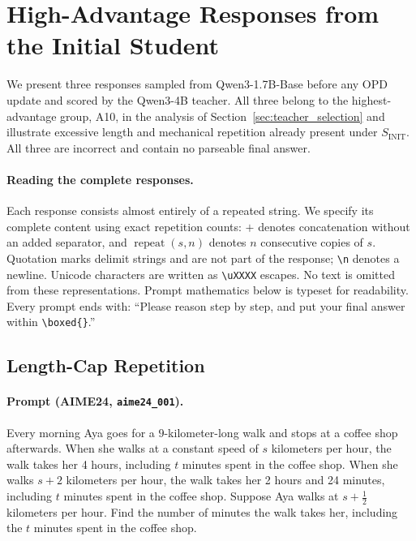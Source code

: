 \section{High-Advantage Responses from the Initial Student}
\label{app:high_advantage_examples}

We present three responses sampled from Qwen3-1.7B-Base before any OPD
update and scored by the Qwen3-4B teacher. All three belong to the
highest-advantage group, A10, in the analysis of
Section~\ref{sec:teacher_selection} and illustrate excessive length and
mechanical repetition already present under $S_{\mathrm{INIT}}$.
All three are incorrect and contain no parseable final answer.

\paragraph{Reading the complete responses.}
Each response consists almost entirely of a repeated string. We specify its
complete content using exact repetition counts: $+$ denotes concatenation
without an added separator, and $\operatorname{repeat}(s,n)$ denotes $n$
consecutive copies of $s$. Quotation marks delimit strings and are not part
of the response; \texttt{\textbackslash n} denotes a newline. Unicode
characters are written as \texttt{\textbackslash uXXXX} escapes. No text is
omitted from these representations. Prompt mathematics below is
typeset for readability. Every prompt ends with: ``Please reason step by
step, and put your final answer within \texttt{\textbackslash boxed\{\}}.''

\subsection{Length-Cap Repetition}

\paragraph{Prompt (AIME24, \texttt{aime24\_001}).}
Every morning Aya goes for a $9$-kilometer-long walk and stops at a coffee
shop afterwards. When she walks at a constant speed of $s$ kilometers per
hour, the walk takes her 4 hours, including $t$ minutes spent in the coffee
shop. When she walks $s+2$ kilometers per hour, the walk takes her 2 hours
and 24 minutes, including $t$ minutes spent in the coffee shop. Suppose Aya
walks at $s+\frac{1}{2}$ kilometers per hour. Find the number of minutes the
walk takes her, including the $t$ minutes spent in the coffee shop.

